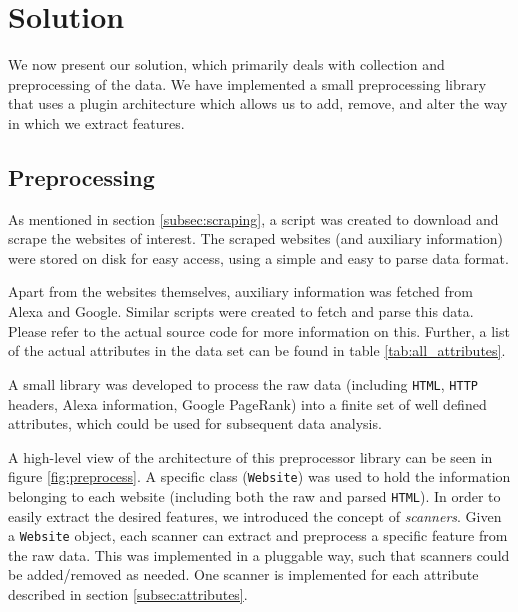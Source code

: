 \section{Solution}
\label{sec:solution}

We now present our solution, which primarily deals with collection and preprocessing of the data. We have implemented a small preprocessing library that uses a plugin architecture which allows us to add, remove, and alter the way in which we extract features.

\subsection{Preprocessing}
\label{subsec:preprocessing}


As mentioned in section \ref{subsec:scraping}, a script was created to download and scrape the websites of interest. The scraped websites (and auxiliary information) were stored on disk for easy access, using a simple and easy to parse data format.

Apart from the websites themselves, auxiliary information was fetched from Alexa and Google. Similar scripts were created to fetch and parse this data. Please refer to the actual source code for more information on this. Further, a list of the actual attributes in the data set can be found in table \ref{tab:all_attributes}.

A small library was developed to process the raw data (including \texttt{HTML}, \texttt{HTTP} headers, Alexa information, Google PageRank) into a finite set of well defined attributes, which could be used for subsequent data analysis.

A high-level view of the architecture of this preprocessor library can be seen in figure \ref{fig:preprocess}. A specific class (\texttt{Website}) was used to hold the information belonging to each website (including both the raw and parsed \texttt{HTML}). In order to easily extract the desired features, we introduced the concept of \textit{scanners}. Given a \texttt{Website} object, each scanner can extract and preprocess a specific feature from the raw data. This was implemented in a pluggable way, such that scanners could be added/removed as needed. One scanner is implemented for each attribute described in section \ref{subsec:attributes}.


